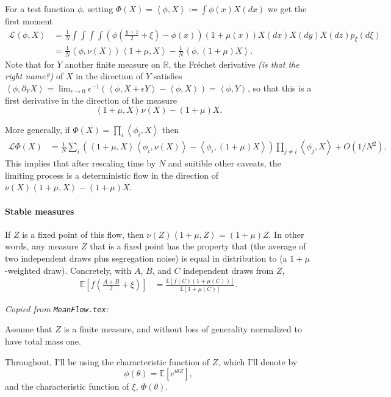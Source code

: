 \documentclass{article}
\newcommand{\E}{\mathbb{E}}
\newcommand{\R}{\mathbb{R}}
\newcommand{\mL}{\mathcal{L}}
\newcommand{\ip}[2]{\left\langle #1, #2 \right\rangle}
\newcommand{\comment}[1]{{\color{blue} \it #1}}
\theoremstyle{remark}
\theoremstyle{definition}
\begin{document}
For a test function $\phi$, setting $\Phi(X) = \ip{\phi}{X} := \int \phi(x) X(dx)$
we get the first moment
\begin{align*}
    \mL \ip{\phi}{X}
    &=
    \frac{1}{N} \int \int \int \int
    \left( \phi \left( \frac{y+z}{2} + \xi \right)
         - \phi(x) \right)
    (1 + \mu(x)) X(dx) X(dy) X(dz) p_\xi(d\xi) \\
    &=
    \frac{1}{N} \ip{\phi}{\nu(X)}\ip{1+\mu}{X}
    - \frac{1}{N} \ip{\phi}{(1+\mu) X} .
\end{align*}
Note that for $Y$ another finite measure on $\R$,
the Fr\'echet derivative \comment{(is that the right name?)} of $X$ in the direction of $Y$
satisfies $\ip{\phi}{\partial_Y X} = \lim_{\epsilon \to 0} \epsilon^{-1} (\ip{\phi}{X + \epsilon Y} - \ip{\phi}{X}) = \ip{\phi}{Y}$,
so that this is a first derivative in the direction of the measure
$$ \ip{1+\mu}{X} \nu(X) - (1+\mu) X . $$

More generally, if $\Phi(X) = \prod_i \ip{\phi_i}{X}$ then
\begin{align*}
    \mL \Phi(X)
    &=
    \frac{1}{N} \sum_i \left( 
        \ip{1+\mu}{X} \ip{\phi_i}{\nu(X)}  - \ip{\phi_i}{(1+\mu)X}
    \right)
    \prod_{j \neq i} \ip{\phi_j}{X} 
    + O(1/N^2) .
\end{align*}
This implies that after rescaling time by $N$
and suitible other caveats,
the limiting process is a deterministic flow in the direction of 
$\nu(X) \ip{1+\mu}{X} - (1+\mu)X$.

\paragraph{Stable measures}
If $Z$ is a fixed point of this flow,
then $\nu(Z)\ip{1+\mu}{Z} = (1+\mu)Z$.
In other words, any measure $Z$ that is a fixed point has the property that
(the average of two independent draws plus segregation noise)
is equal in distribution to
(a $1+\mu$-weighted draw).
Concretely, with $A$, $B$, and $C$ independent draws from $Z$,
\begin{align} \label{eqn:ABC_condition}
    \E\left[ f\left( \frac{A+B}{2} + \xi \right) \right]
    &=
    \frac{\E\left[ f(C) (1+\mu(C)) \right]}{\E[1+\mu(C)]} .
\end{align}

\comment{Copied from \texttt{MeanFlow.tex}:}

Assume that $Z$ is a finite measure, and without loss of generality normalized to have total mass one.

Throughout, I'll be using the characteristic function of $Z$, which I'll denote by 
\[
	\phi(\theta) = \mathbb{E}\left[e^{i\theta Z}\right],
\]
and the characteristic function of $\xi$, $\Phi(\theta)$.
\end{document}
